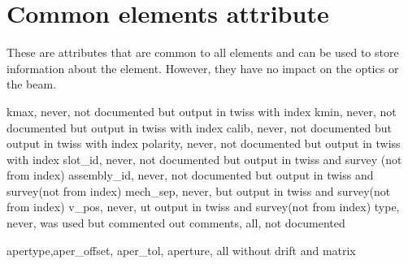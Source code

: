\section{Common elements attribute}  
\label{sec:common:elementes}
These are attributes that are common to all elements and can be used to store information about the element. However, they have no impact on the optics or the beam. 


kmax, never, not documented but output in twiss with index
kmin, never, not documented but output in twiss with index
calib, never, not documented but output in twiss with index
polarity, never, not documented but output in twiss with index
slot_id, never, not documented but output in twiss and survey (not from index)
assembly_id, never, not documented but output in twiss and survey(not from index)
mech_sep, never, but output in twiss and survey(not from index)
v_pos, never, ut output in twiss and survey(not from index)
type, never, was used but commented out 
comments, all, not documented

apertype,aper_offset, aper_tol, aperture, all without drift and matrix
